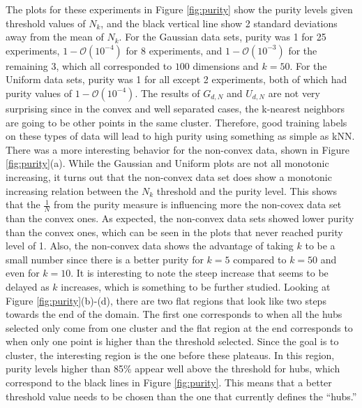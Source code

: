\documentclass[graybox]{svmult}
\begin{document}
The plots for these experiments in Figure \ref{fig:purity} show the purity levels given threshold values of $N_k$, and the black vertical line show 2 standard deviations away from the mean of $N_k$. For the Gaussian data sets, purity was 1 for 25 experiments, $1 - \mathcal{O}(10^{-4})$ for 8 experiments, and $1 - \mathcal{O}(10^{-3})$ for the remaining 3, which all corresponded to $100$ dimensions and $k=50$. For the Uniform data sets, purity was 1 for all except 2 experiments, both of which had purity values of $1 - \mathcal{O}(10^{-4})$. The results of $G_{d,N}$ and $U_{d,N}$ are not very surprising since in the convex and well separated cases, the k-nearest neighbors are going to be other points in the same cluster. Therefore, good training labels on these types of data will lead to high purity using something as simple as kNN. There was a more interesting behavior for the non-convex data, shown in Figure \ref{fig:purity}(a). While the Gaussian and Uniform plots are not all monotonic increasing, it turns out that the non-convex data set does show a monotonic increasing relation between the $N_k$ threshold and the purity level. This shows that the $\frac{1}{N}$ from the purity measure is influencing more the non-covex data set than the convex ones. As expected, the non-convex data sets showed lower purity than the convex ones, which can be seen in the plots that never reached purity level of 1. Also, the non-convex data shows the advantage of taking $k$ to be a small number since there is a better purity for $k=5$ compared to $k=50$ and even for $k=10$. It is interesting to note the steep increase that seems to be delayed as $k$ increases, which is something to be further studied. Looking at Figure \ref{fig:purity}(b)-(d), there are two flat regions that look like two steps towards the end of the domain. The first one corresponds to when all the hubs selected only come from one cluster and the flat region at the end corresponds to when only one point is higher than the threshold selected. Since the goal is to cluster, the interesting region is the one before these plateaus. In this region, purity levels higher than 85\% appear well above the threshold for hubs, which correspond to the black lines in Figure \ref{fig:purity}. This means that a better threshold value needs to be chosen than the one that currently defines the ``hubs.'' 
\end{document}

